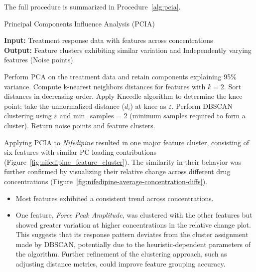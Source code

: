 \documentclass{report}
\begin{document}
        The full procedure is summarized in Procedure~\ref{alg:pcia}.
        
        \begin{algorithm}[H]
        \caption{Principal Components Influence Analysis (PCIA)}
        \label{alg:pcia}
        \textbf{Input:} Treatment response data with features across concentrations \\
        \textbf{Output:} Feature clusters exhibiting similar variation and Independently varying features (Noise points)
        \begin{algorithmic}[1]
            \State Perform PCA on the treatment data and retain components explaining 95\% variance.
            \State Compute k-nearest neighbors distances for features with \( k = 2 \).
            \State Sort distances in decreasing order.
            \State Apply Kneedle algorithm to determine the knee point; take the unnormalized distance ($d_i$) at knee as \(\varepsilon\).
            \State Perform DBSCAN clustering using \(\varepsilon\) and min\_samples = 2 (minimum samples required to form a cluster).
            \State Return noise points and feature clusters.
        \end{algorithmic}
        \end{algorithm}
                
        Applying PCIA to \textit{Nifedipine} resulted in one major feature cluster, consisting of six features with similar PC loading contributions (Figure~\ref{fig:nifedipine_feature_cluster}). The similarity in their behavior was further confirmed by visualizing their relative change across different drug concentrations (Figure~\ref{fig:nifedipine-average-concentration-diffs}). 
        
        \begin{itemize}
            \item Most features exhibited a consistent trend across concentrations.
            \item One feature, \textit{Force Peak Amplitude}, was clustered with the other features but showed greater variation at higher concentrations in the relative change plot. This suggests that its response pattern deviates from the cluster assignment made by DBSCAN, potentially due to the heuristic-dependent parameters of the algorithm. Further refinement of the clustering approach, such as adjusting distance metrics, could improve feature grouping accuracy.
        \end{itemize}
        
\end{document}
